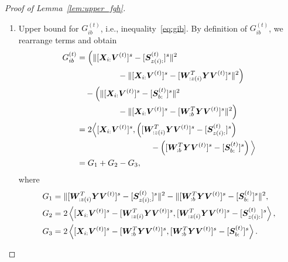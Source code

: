\documentclass[journal]{IEEEtran}
\theoremstyle{definition}
\theoremstyle{definition}
\newcommand{\of}[1]{\left(#1\right)}
\newcommand{\ang}[1]{\left\langle#1\right\rangle}
\begin{document}
\begin{proof}[Proof of Lemma~\ref{lem:upper_fgh}]
\begin{enumerate}[wide]
    \item Upper bound for $G_{ib}^{(t)}$, i.e., inequality~\eqref{eq:gib}. By definition of $G_{ib}^{(t)}$, we rearrange terms and obtain
    \begin{align}
        G_{ib}^{(t)} &=   \Big( \onormSize{}{ [\mX_{i:} \mV^{(t)}]^s -  [  \mS_{z(i):}^{(t)}  ]^s}^2 \\
        &\quad \quad \quad \quad \quad-  \onormSize{}{ [\mX_{i:} \mV^{(t)}]^s -  [  \mW_{:z(i)}^T \mY \mV^{(t)} ]^s}^2\Big)   \\
        & \quad -   \Big( \onormSize{}{ [\mX_{i:} \mV^{(t)}]^s -  [  \mS_{b:}^{(t)}  ]^s}^2 \\
        & \quad \quad \quad \quad \quad -  \onormSize{}{ [\mX_{i:} \mV^{(t)}]^s -  [  \mW_{:b}^T \mY \mV^{(t)} ]^s}^2 \Big) \\
        &= 2 \Big\langle  [\mX_{i:} \mV^{(t)}]^s , \of{[  \mW_{:z(i)}^T \mY \mV^{(t)} ]^s -  [  \mS_{z(i):}^{(t)}  ]^s } \\
        &\quad \quad \quad \quad \quad  \quad \quad \quad \quad  - \of{ [  \mW_{:b}^T \mY \mV^{(t)} ]^s -  [  \mS_{b:}^{(t)}  ]^s } \Big\rangle \\
      &= G_1 + G_2 - G_3, \label{eq:gib_decomp}
    \end{align}
    where 
    \small
    \begin{align}
        G_1 &= \onormSize{}{ [  \mW_{:z(i)}^T \mY \mV^{(t)} ]^s -  [  \mS_{z(i):}^{(t)}  ]^s}^2 - \onormSize{}{ [  \mW_{:b}^T \mY \mV^{(t)} ]^s -  [  \mS_{b:}^{(t)}  ]^s }^2,\\
        G_2 &= 2 \ang{ [\mX_{i:} \mV^{(t)}]^s  -  [  \mW_{:z(i)}^T \mY \mV^{(t)} ]^s,   [  \mW_{:z(i)}^T \mY \mV^{(t)} ]^s -  [  \mS_{z(i):}^{(t)}  ]^s},\\
        G_3 & = 2 \ang{ [\mX_{i:} \mV^{(t)}]^s  -  [  \mW_{:b}^T \mY \mV^{(t)} ]^s,  [  \mW_{:b}^T \mY \mV^{(t)} ]^s -  [  \mS_{b:}^{(t)}  ]^s}.
    \end{align}
    \normalsize
    

\end{enumerate}
\end{proof}
\end{document}
